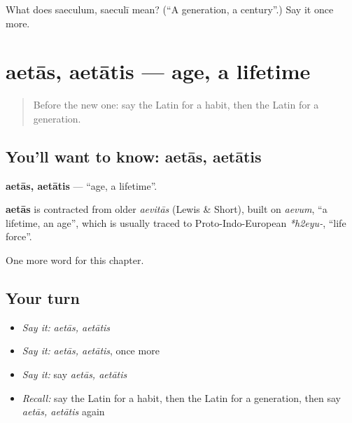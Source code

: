\begin{tcolorbox}[breakable,colback=teal!4,colframe=teal!35!black,title={Before you move on}]
What does saeculum, saeculī mean? (\textquotedblleft{}A generation, a century\textquotedblright{}.) Say it once more.
\end{tcolorbox}
\section[aetās, aetātis]{aetās, aetātis — age, a lifetime}

\label{lesson:LA-C207-aetas}



\begin{quote}
Before the new one: say the Latin for a habit, then the Latin for a generation.
\end{quote}

\subsection*{You'll want to know: aetās, aetātis}
\textbf{aetās, aetātis} — \textquotedblleft{}age, a lifetime\textquotedblright{}.

\begin{cousinweb}
\textbf{aetās} is contracted from older \emph{aevitās} (Lewis \& Short), built on \emph{aevum}, \textquotedblleft{}a lifetime, an age\textquotedblright{}, which is usually traced to Proto-Indo-European \emph{*h2eyu-}, \textquotedblleft{}life force\textquotedblright{}.
\end{cousinweb}

\begin{grammarlens}[title={What you've built}]
One more word for this chapter.
\end{grammarlens}

\subsection*{Your turn}
\begin{itemize}
\raggedright
  \item \emph{Say it:} \emph{aetās, aetātis}
  \item \emph{Say it:} \emph{aetās, aetātis}, once more
  \item \emph{Say it:} say \emph{aetās, aetātis}
  \item \emph{Recall:} say the Latin for a habit, then the Latin for a generation, then say \emph{aetās, aetātis} again
\end{itemize}

